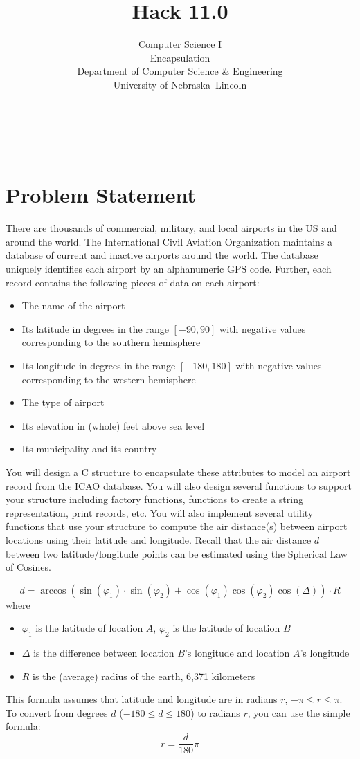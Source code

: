 \documentclass[12pt]{scrartcl}
\title{Hack 11.0}\let\Title\@title
\subtitle{Computer Science I\\
Encapsulation\\
{\small
\vskip1cm
Department of Computer Science \& Engineering \\
University of Nebraska--Lincoln}
\vskip-3cm}
\date{~}
\begin{document}
\maketitle

\hrule



\section*{Problem Statement}

There are thousands of commercial, military, and local airports in the US and
around the world.  The International Civil Aviation Organization maintains a
database of current and inactive airports around the world.  The database 
uniquely identifies each airport by an alphanumeric GPS code.  Further, each
record contains the following pieces of data on each airport:
\begin{itemize}
  \item The name of the airport
  \item Its latitude in degrees in the range $[-90, 90]$ with negative values corresponding to the southern hemisphere
  \item Its longitude in degrees in the range $[-180, 180]$ with negative values corresponding to the western hemisphere
  \item The type of airport 
  \item Its elevation in (whole) feet above sea level
  \item Its municipality and its country
\end{itemize}

You will design a C structure to encapsulate these attributes to model an
airport record from the ICAO database.  You will also design several functions
to support your structure including factory functions, functions to 
create a string representation, print records, etc. You will also implement
several utility functions that use your structure to compute the air
distance(s) between airport locations using their latitude and longitude.
Recall that the air distance $d$ between two latitude/longitude points can be 
estimated using the Spherical Law of Cosines.

 $$d = \arccos{(\sin(\varphi_1) \cdot \sin(\varphi_2) + \cos(\varphi_1) \cos(\varphi_2) \cos(\Delta) )} \cdot R$$
where
\begin{itemize}
  \item $\varphi_1$ is the latitude of location $A$, $\varphi_2$ is the latitude of location $B$
  \item $\Delta$ is the difference between location $B$'s longitude and location $A$'s longitude
  \item $R$ is the (average) radius of the earth, 6,371 kilometers
\end{itemize}
This formula assumes that latitude and longitude are in radians 
$r$, $-\pi \leq r \leq \pi$.  To convert from degrees $d$ ($-180 \leq d \leq 180$) 
to radians $r$, you can use the simple formula:
  $$r = \frac{d}{180} \pi$$
\end{document}

